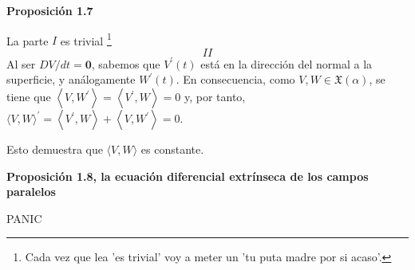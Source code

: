 \documentclass[openany]{book}
\begin{document}
\begin{center}
\textbf{Proposición 1.7}
\end{center}
\begin{demonstration}
  La parte $I$ es trivial \footnote{Cada vez que lea 'es trivial' voy a meter un 'tu puta madre por si acaso'.}
    $$ II $$
  Al ser $D V / d t=\mathbf{0}$, sabemos que $V^{\prime}(t)$ está en la dirección del normal a la superficie, y análogamente $W^{\prime}(t)$. En consecuencia, como $V, W \in \mathfrak{X}(\alpha)$, se tiene que $\left\langle V, W^{\prime}\right\rangle=\left\langle V^{\prime}, W\right\rangle=0$ y, por tanto, $\langle V, W\rangle^{\prime}=\left\langle V^{\prime}, W\right\rangle+\left\langle V, W^{\prime}\right\rangle=0$.

  Esto demuestra que $\langle V, W\rangle$ es constante.
\end{demonstration}

\begin{center}
\textbf{Proposición 1.8, la ecuación diferencial extrínseca de los campos paralelos}
\end{center}
\begin{demonstration}
  PANIC
\end{demonstration}
\end{document}
